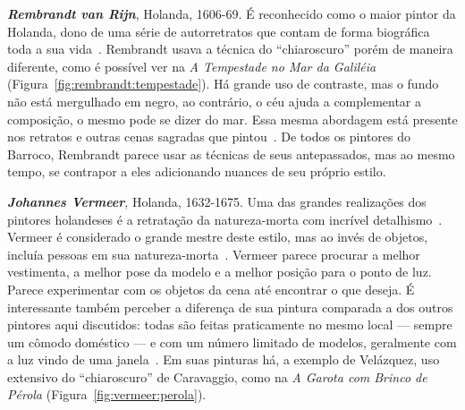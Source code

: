 \textbf{\emph{Rembrandt van Rijn}}, Holanda, 1606-69. É reconhecido
como o maior pintor da Holanda, dono de uma série de autorretratos que
contam de forma biográfica toda a sua vida~\cite{van1999,
  gombrich}. Rembrandt usava a técnica do ``chiaroscuro'' porém de
maneira diferente, como é possível ver na \textit{A Tempestade no Mar
  da Galiléia} (Figura~\ref{fig:rembrandt:tempestade}).  Há grande uso
de contraste, mas o fundo não está mergulhado em negro, ao contrário,
o céu ajuda a complementar a composição, o mesmo pode se dizer do
mar. Essa mesma abordagem está presente nos retratos e outras cenas
sagradas que pintou~\cite{van1997}. De todos os pintores do Barroco,
Rembrandt parece usar as técnicas de seus antepassados, mas ao mesmo
tempo, se contrapor a eles adicionando nuances de seu próprio estilo.

\textbf{\emph{Johannes Vermeer}}, Holanda, 1632-1675. Uma das grandes realizações dos
pintores holandeses é a retratação da natureza-morta com incrível
detalhismo~\cite{wadum}. Vermeer é considerado o grande mestre deste
estilo, mas ao invés de objetos, incluía pessoas em sua
natureza-morta~\cite{gombrich}.  Vermeer parece procurar a melhor
vestimenta, a melhor pose da modelo e a melhor posição para o ponto de
luz. Parece experimentar com os objetos da cena até encontrar o que
deseja. É interessante também perceber a diferença de sua pintura
comparada a dos outros pintores aqui discutidos: todas são feitas
praticamente no mesmo local --- sempre um cômodo doméstico --- e com
um número limitado de modelos, geralmente com a luz vindo de uma
janela~\cite{wadum1998}.  Em suas pinturas há, a exemplo de Velázquez,
uso extensivo do ``chiaroscuro'' de Caravaggio, como na \textit{A
  Garota com Brinco de Pérola} (Figura~\ref{fig:vermeer:perola}).


